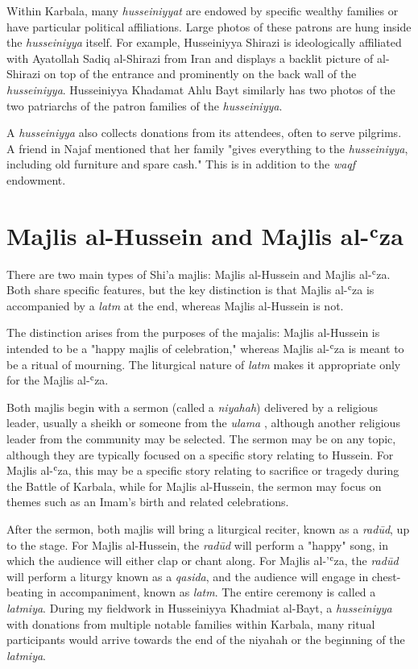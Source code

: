 Within Karbala, many \emph{husseiniyyat} are endowed by specific wealthy families or have particular political affiliations. Large photos of these patrons are hung inside the \emph{husseiniyya} itself. For example, Husseiniyya Shirazi is ideologically affiliated with Ayatollah Sadiq al-Shirazi from Iran and displays a backlit picture of al-Shirazi on top of the entrance and prominently on the back wall of the \emph{husseiniyya}. Husseiniyya Khadamat Ahlu Bayt similarly has two photos of the two patriarchs of the patron families of the \emph{husseiniyya}.

A \emph{husseiniyya} also collects donations from its attendees, often to serve pilgrims. A friend in Najaf mentioned that her family "gives everything to the \emph{husseiniyya}, including old furniture and spare cash." This is in addition to the \emph{waqf} endowment. 

\section{Majlis al-Hussein and Majlis al-ʿza}
There are two main types of Shi'a majlis: Majlis al-Hussein and Majlis al-ʿza. Both share specific features, but the key distinction is that Majlis al-ʿza is accompanied by a \emph{latm} at the end, whereas Majlis al-Hussein is not.

The distinction arises from the purposes of the majalis: Majlis al-Hussein is intended to be a "happy majlis of celebration," \cite{al-husseini_interview_2022} whereas Majlis al-ʿza is meant to be a ritual of mourning. The liturgical nature of \emph{latm} makes it appropriate only for the Majlis al-ʿza.

Both majlis begin with a sermon (called a \emph{niyahah}) delivered by a religious leader, usually a sheikh or someone from the \emph{ulama} \cite{hamdan_development_2012}, although another religious leader from the community may be selected. The sermon may be on any topic, although they are typically focused on a specific story relating to Hussein. For Majlis al-ʿza, this may be a specific story relating to sacrifice or tragedy during the Battle of Karbala, while for Majlis al-Hussein, the sermon may focus on themes such as an Imam's birth and related celebrations.

After the sermon, both majlis will bring a liturgical reciter, known as a \emph{radūd}, up to the stage. For Majlis al-Hussein, the \emph{radūd} will perform a "happy" song, in which the audience will either clap or chant along. For Majlis al-'ʿza, the \emph{radūd} will perform a liturgy known as a \emph{qasida}, and the audience will engage in chest-beating in accompaniment, known as \emph{latm}. The entire ceremony is called a \emph{latmiya}. During my fieldwork in Husseiniyya Khadmiat al-Bayt, a \emph{husseiniyya} with donations from multiple notable families within Karbala, many ritual participants would arrive towards the end of the niyahah or the beginning of the \emph{latmiya}.

